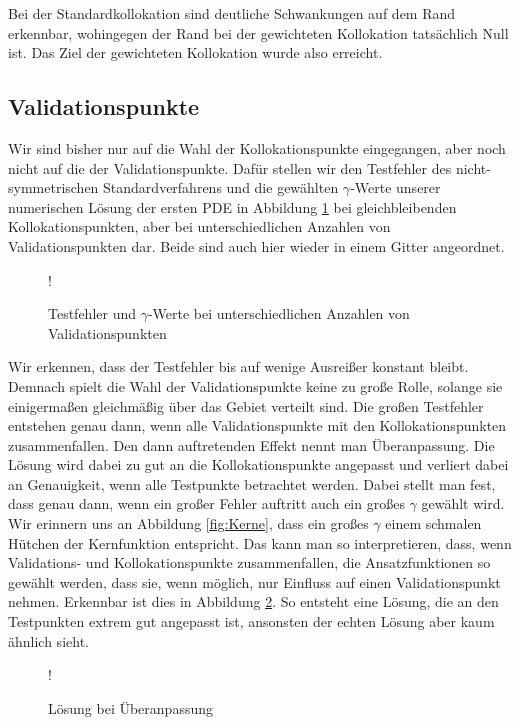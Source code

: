 Bei der Standardkollokation sind deutliche Schwankungen auf dem Rand erkennbar, wohingegen der Rand bei der gewichteten Kollokation tatsächlich Null ist. Das Ziel der gewichteten Kollokation wurde also erreicht.

\subsection{Validationspunkte}
Wir sind bisher nur auf die Wahl der Kollokationspunkte eingegangen, aber noch nicht auf die der Validationspunkte. Dafür stellen wir den Testfehler des nicht-symmetrischen Standardverfahrens und die gewählten $\gamma$-Werte unserer numerischen Lösung der ersten \ac{PDE} in Abbildung \ref{fig:testpunkte} bei gleichbleibenden Kollokationspunkten, aber bei unterschiedlichen Anzahlen von Validationspunkten dar. Beide sind auch hier wieder in einem Gitter angeordnet.
\begin{figure}[ht]
\centering
\resizebox {\columnwidth} {!} {

}
\caption{Testfehler und $\gamma$-Werte bei unterschiedlichen Anzahlen von Validationspunkten}
\label{fig:testpunkte}
\end{figure}
Wir erkennen, dass der Testfehler bis auf wenige Ausreißer konstant bleibt. Demnach spielt die Wahl der Validationspunkte keine zu große Rolle, solange sie einigermaßen gleichmäßig über das Gebiet verteilt sind. Die großen Testfehler entstehen genau dann, wenn alle Validationspunkte mit den Kollokationspunkten zusammenfallen. Den dann auftretenden Effekt nennt man Überanpassung. Die Lösung wird dabei zu gut an die Kollokationspunkte angepasst und verliert dabei an Genauigkeit, wenn alle Testpunkte betrachtet werden. Dabei stellt man fest, dass genau dann, wenn ein großer Fehler auftritt auch ein großes $\gamma$ gewählt wird. Wir erinnern uns an Abbildung \ref{fig:Kerne}, dass ein großes $\gamma$ einem schmalen \glqq Hütchen\grqq{}  der Kernfunktion entspricht. Das kann man so interpretieren, dass, wenn Validations- und Kollokationspunkte zusammenfallen, die Ansatzfunktionen so gewählt werden, dass sie, wenn möglich, nur \glqq Einfluss\grqq{} auf einen Validationspunkt nehmen. Erkennbar ist dies in Abbildung \ref{fig:overfitting}. So entsteht eine Lösung, die an den Testpunkten extrem gut angepasst ist, ansonsten der echten Lösung aber kaum ähnlich sieht.
\begin{figure}[ht]
\centering
\resizebox {\columnwidth} {!} {

}
\caption{Lösung bei Überanpassung}
\label{fig:overfitting}
\end{figure}

